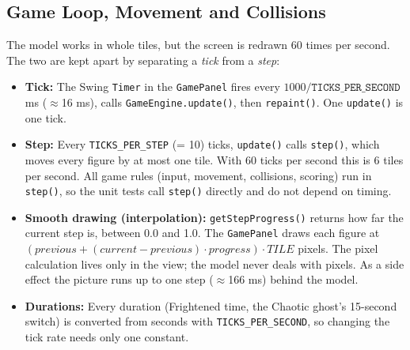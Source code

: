 \documentclass[11pt, a4paper]{article}
\begin{document}
\clearpage

\subsection{Game Loop, Movement and Collisions}
\label{sec:game_loop}
The model works in whole tiles, but the screen is redrawn 60 times per second. The two are kept apart by separating a \textit{tick} from a \textit{step}:
\begin{itemize}
    \item \textbf{Tick:} The Swing \texttt{Timer} in the \texttt{GamePanel} fires every $1000 / \texttt{TICKS\_PER\_SECOND}$ ms ($\approx$16 ms), calls \texttt{GameEngine.update()}, then \texttt{repaint()}. One \texttt{update()} is one tick.
    \item \textbf{Step:} Every \texttt{TICKS\_PER\_STEP} (= 10) ticks, \texttt{update()} calls \texttt{step()}, which moves every figure by at most one tile. With 60 ticks per second this is 6 tiles per second. All game rules (input, movement, collisions, scoring) run in \texttt{step()}, so the unit tests call \texttt{step()} directly and do not depend on timing.
    \item \textbf{Smooth drawing (interpolation):} \texttt{getStepProgress()} returns how far the current step is, between 0.0 and 1.0. The \texttt{GamePanel} draws each figure at $(\textit{previous} + (\textit{current} - \textit{previous}) \cdot \textit{progress}) \cdot \textit{TILE}$ pixels. The pixel calculation lives only in the view; the model never deals with pixels. As a side effect the picture runs up to one step ($\approx$166 ms) behind the model.
    \item \textbf{Durations:} Every duration (Frightened time, the Chaotic ghost's 15-second switch) is converted from seconds with \texttt{TICKS\_PER\_SECOND}, so changing the tick rate needs only one constant.
\end{itemize}
\end{document}
